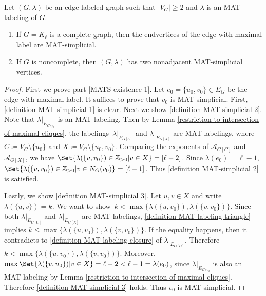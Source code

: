 \begin{lemma}
\label{lem:MATS-existence}
Let $ (G, \lambda) $ be an edge-labeled graph such that $ |V_{G}| \geq 2 $ and $ \lambda $ is an MAT-labeling of $ G $. 
\begin{enumerate}[(1)]
\item\label{MATS-existence 1} If $ G = K_{\ell} $ is a complete graph, then the endvertices of the edge with maximal label are MAT-simplicial. 
\item\label{MATS-existence 2} 
If $ G $ is noncomplete, then $ (G, \lambda) $ has two nonadjacent MAT-simplicial vertices. 
\end{enumerate}
\end{lemma}
\begin{proof}
First we prove part \ref{MATS-existence 1}. 
Let $ e_{0} = \{u_{0}, v_{0}\} \in E_{G} $ be the edge with maximal label. 
It suffices to prove that $ v_{0} $ is MAT-simplicial. 
First, \ref{definition MAT-simplicial 1} is clear. 
Next we show \ref{definition MAT-simplicial 2}. 
Note that $ \lambda|_{E_{G\setminus e_0}} $ is an MAT-labeling.
Then by Lemma \ref{restriction to intersection of maximal cliques}, the labelings~$ \lambda|_{E_{G[C]}} $ and $ \lambda|_{E_{G[X]}} $ are MAT-labelings, where $ C \coloneqq V_{G}\setminus\{u_{0}\} $ and $ X \coloneqq V_{G} \setminus \{u_{0}, v_{0}\} $. 
Comparing the exponents of $ \mathcal{A}_{G[C]} $ and $ \mathcal{A}_{G[X]} $, we have $ \Set{\lambda(\{v, v_{0}\}) \in \mathbb{Z}_{>0} | v \in X } = [\ell -2] $. 
Since $ \lambda(e_{0}) = \ell -1 $, $ \Set{\lambda(\{v, v_{0}\}) \in \mathbb{Z}_{>0} | v \in N_{G}(v_{0}) } = [\ell -1] $.
Thus \ref{definition MAT-simplicial 2} is satisfied. 

Lastly,  we show \ref{definition MAT-simplicial 3}. 
Let $ u,v \in X $ and write $ \lambda(\{u,v\}) = k $. 
We want to show~$ k<\max\{\lambda(\{u,v_{0}\}), \lambda(\{v,v_{0}\})\} $. 
Since both $ \lambda|_{E_{G[C]}} $ and $ \lambda|_{E_{G[X]}} $ are MAT-labelings, \ref{definition MAT-labeling triangle} implies $ k \leq \max\{\lambda(\{u,v_{0}\}), \lambda(\{v,v_{0}\})\} $. 
If the equality happens, then it contradicts to \ref{definition MAT-labeling closure} of $ \lambda|_{E_{G[C]}} $. 
Therefore $ k < \max\{\lambda(\{u,v_{0}\}), \lambda(\{v,v_{0}\})\} $. 
Moreover, $ \max\Set{\lambda(\{v,u_{0}\}) | v \in X} = \ell -2 < \ell - 1 = \lambda(e_{0}) $, since $ \lambda|_{E_{G\setminus v_{0}}} $ is also an MAT-labeling by Lemma \ref{restriction to intersection of maximal cliques}. 
Therefore \ref{definition MAT-simplicial 3} holds. 
Thus $ v_0 $ is MAT-simplicial. 


\end{proof}
